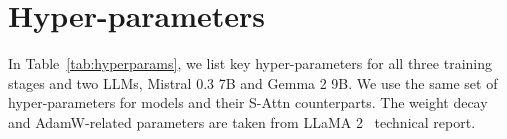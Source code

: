 \section{Hyper-parameters}

In Table~\ref{tab:hyperparams}, we list key hyper-parameters for all three training stages and two LLMs, Mistral 0.3 7B and Gemma 2 9B.
We use the same set of hyper-parameters for \method{} models and their S-Attn counterparts.
The weight decay and AdamW-related parameters are taken from LLaMA 2~\citep{touvron2023llama} technical report.


